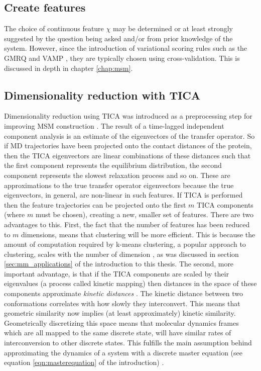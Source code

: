 \subsection{Create features}
The choice of continuous feature $\chi$ may be determined or at least strongly suggested by the question being asked and/or from prior knowledge of the system. However, since the introduction of variational scoring rules such as the GMRQ \cite{mcgibbonVariationalCrossvalidationSlow2015} and VAMP \cite{wuVariationalApproachLearning2020c}, they are typically chosen using cross-validation. This is discussed in depth in chapter \ref{chap:msm}. 

\subsection{Dimensionality reduction with TICA}\label{sec:theory_tica}

Dimensionality reduction using TICA was introduced as a preprocessing step for improving MSM construction \cite{perez-hernandezIdentificationSlowMolecular2013a, schwantesImprovementsMarkovState2013}. The result of a time-lagged independent component analysis is an estimate of the eigenvectors of the transfer operator. So if MD trajectories have been projected onto the contact distances of the protein, then the TICA eigenvectors are linear combinations of these distances such that the first component represents the equilibrium distribution, the second component represents the slowest relaxation process and so on. These are approximations to the true transfer operator eigenvectors because the true eigenvectors, in general, are non-linear in such features. If TICA is performed then the feature trajectories can be projected onto the first $m$ TICA components (where $m$ must be chosen), creating a new, smaller set of features. There are two advantages to this. First, the fact that the number of features has been reduced to $m$ dimensions, means that clustering will be more efficient. This is because the amount of computation required by k-means clustering, a popular approach to clustering,  scales with the number of dimension \cite{celebiComparativeStudyEfficient2013}, as was discussed in section \ref{sec:mm_applications} of the introduction to this thesis. The second, more important advantage, is that  if the TICA components are scaled by their eigenvalues (a process called kinetic mapping) then distances in the space of these components approximate \emph{kinetic distances} \cite{noeKineticDistanceKinetic2015}. The kinetic distance between two conformations correlates with how slowly they interconvert.  This means that geometric similarity now implies (at least approximately) kinetic similarity. Geometrically discretizing this space means that molecular dynamics frames which are all mapped to the same discrete state, will have similar rates of interconversion to other discrete states. This fulfills the main assumption behind approximating the dynamics of a system with a discrete master equation (see equation \ref{eqn:masterequation} of the introduction) \cite{zwanzigClassicalDynamicsContinuous1983a, noeTransitionNetworksModeling2008}.  


